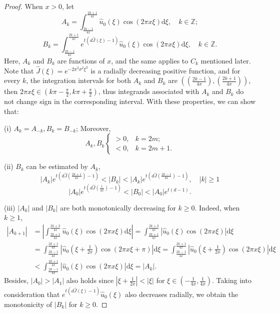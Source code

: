 \documentclass[12pt]{article}
\newcommand{\Z}{\mathbb{Z}}
\newcommand{\dd}{\mathrm{d}}
\begin{document}
\begin{proof}
 When \(x > 0\), let
\[
A_k = \int_{\frac{2k-1}{4x}}^{\frac{2k+1}{4x}} \hat{u}_0 (\xi) \cos (2\pi x \xi) \dd \xi, \quad k \in \Z;
\]
\[
B_k = \int_{\frac{2k-1}{4x}}^{\frac{2k+1}{4x}} e^{t(d\hat{J}(\xi)-1)} \hat{u}_0 (\xi) \cos (2\pi x \xi) \dd \xi, \quad k \in \mathbb{Z}.
\]
Here, \(A_k\) and \(B_k\) are functions of \(x\), and the same applies to \(C_k\) mentioned later. Note that \(\hat{J}(\xi)=e^{-2\pi^2 \sigma^2\xi^2}\) is a radially decreasing positive function, and for every \(k\), the integration intervals for both \(A_k\) and \(B_k\) are \(\left( (\frac{2k-1}{4x}),(\frac{2k+1}{4x})\right) \), then \(2\pi x\xi\in (k\pi-\frac{\pi}{2},k\pi+\frac{\pi}{2})\), thus integrands associated with \(A_k\) and \(B_k\) do not change sign in the corresponding interval. With these properties, we can show that:

(i) \( A_k = A_{-k}, B_k = B_{-k} \); Moreover,
\[
A_k, B_k
\begin{cases} 
	> 0, & k = 2m;\\ 
	< 0, & k = 2m + 1.
\end{cases}
\]

(ii) \(B_k\) can be estimated by \(A_k\),
\begin{equation}\label{5}
	|A_k|e^{t\left( d\hat{J}\left( \frac{2k+1}{4x} \right)-1 \right)} < |B_k| < |A_k|e^{t\left( d\hat{J}\left( \frac{2k-1}{4x} \right)-1 \right)}, \quad |k| \geq 1
\end{equation}
\begin{equation}\label{6}
	|A_0|e^{t\left( d\hat{J}\left( \frac{1}{4x} \right)-1 \right)} < |B_0| < |A_0|e^{t(d-1)}.
\end{equation}

(iii) \(|A_k|\) and \(|B_k|\) are both monotonically decreasing for \(k\geq0\). Indeed, when \(k\geq 1\),
\begin{align*}
	|A_{k+1}| &= \left| \int_{\frac{2k+1}{4x}}^{\frac{2k+3}{4x}} \hat{u}_0 (\xi) \cos (2\pi x \xi) \dd \xi\right|=\int_{\frac{2k+1}{4x}}^{\frac{2k+3}{4x}} \left| \hat{u}_0 (\xi) \cos (2\pi x \xi)\right|  \dd \xi  \\
	&=  \int_{\frac{2k-1}{4x}}^{\frac{2k+1}{4x}} \left|\hat{u}_0 \left(\xi+\frac{1}{2x}\right) \cos (2\pi x \xi + \pi)\right| \dd \xi= \int_{\frac{2k-1}{4x}}^{\frac{2k+1}{4x}} \left| \hat{u}_0 \left(\xi+\frac{1}{2x}\right) \cos (2\pi x \xi)\right|  \dd \xi  \\
	&< \int_{\frac{2k-1}{4x}}^{\frac{2k+1}{4x}} \left| \hat{u}_0 \left(\xi\right) \cos (2\pi x \xi)\right|\dd \xi=|A_k|.
\end{align*}
Besides, \(|A_0|>|A_1|\) also holds since \(|\xi+\frac{1}{2x}|<|\xi|\) for \(\xi\in (-\frac{1}{4x},\frac{1}{4x})\). Taking into consideration that \( e^{t(d\hat{J}(\xi)-1)}\hat{u}_0(\xi)\) also decreases radially, we obtain the monotonicity of \(|B_k|\) for \(k\geq0\).


\end{proof}
\end{document}
